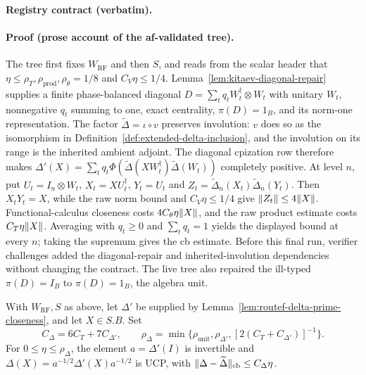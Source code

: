 \noindent\textbf{Registry contract (verbatim).}

\paragraph{Proof (prose account of the af-validated tree).}
The tree first fixes $W_{\mathrm{RF}}$ and then $S$, and reads from the scalar header that
$\eta\le\rho_T,\rho_{\mathrm{prod}},\rho_\theta=1/8$ and $C_V\eta\le1/4$.
Lemma~\ref{lem:kitaev-diagonal-repair} supplies a finite phase-balanced diagonal
$D=\sum_tq_tW_t^\dagger\otimes W_t$ with unitary $W_t$, nonnegative $q_t$ summing to one,
exact centrality, $\pi(D)=1_B$, and its norm-one representation.  The factor
$\widetilde\Delta=\iota\circ v$ preserves involution: $v$ does so as the isomorphism in
Definition~\ref{def:extended-delta-inclusion}, and the involution on its range is the inherited
ambient adjoint.  The diagonal cpization row therefore makes
$\Delta'(X)=\sum_tq_t\Phi(\widetilde\Delta(XW_t^\dagger)\widetilde\Delta(W_t))$ completely positive.
At level $n$, put $U_t=I_n\otimes W_t$, $X_t=XU_t^\dagger$, $Y_t=U_t$ and
$Z_t=\widetilde\Delta_n(X_t)\widetilde\Delta_n(Y_t)$.  Then $X_tY_t=X$, while the raw norm
bound and $C_V\eta\le1/4$ give $\lVert Z_t\rVert\le4\lVert X\rVert$.  Functional-calculus closeness costs
$4C_\theta\eta\lVert X\rVert$, and the raw product estimate costs $C_T\eta\lVert X\rVert$.
Averaging with $q_t\ge0$ and $\sum_tq_t=1$ yields the displayed bound at every $n$;
taking the supremum gives the cb estimate.  Before this final run, verifier challenges
added the diagonal-repair and inherited-involution dependencies without changing the contract.
The live tree also repaired the ill-typed $\pi(D)=I_B$ to $\pi(D)=1_B$, the algebra unit.

\begin{lemma}\label{lem:routef-delta-normalization-closeness}
With $W_{\mathrm{RF}},S$ as above, let $\Delta'$ be supplied by
Lemma~\ref{lem:routef-delta-prime-closeness}, and let $X\in S.B$.  Set
\[
 C_\Delta=6C_T+7C_{\Delta'},\qquad
 \rho_\Delta=\min\{\rho_{\mathrm{unit}},\rho_{\Delta'},[2(C_T+C_{\Delta'})]^{-1}\}.
\]
For $0\le\eta\le\rho_\Delta$, the element $a=\Delta'(I)$ is invertible and
$\Delta(X)=a^{-1/2}\Delta'(X)a^{-1/2}$ is UCP, with
$\lVert \Delta-\widetilde\Delta\rVert_{\mathrm{cb}}\le C_\Delta\eta$.
\end{lemma}

